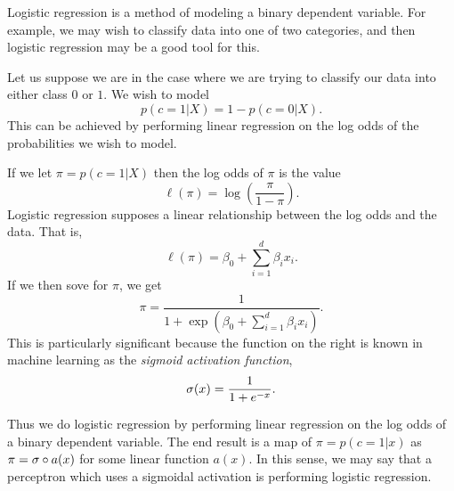 \label{logisticReg}
Logistic regression is a method of modeling a binary dependent variable.  For 
example, we may wish to classify data into one of two categories, and then 
logistic regression may be a good tool for this.

Let us suppose we are in the case where we are trying to classify our data into either class \(0\) or \(1\).  We wish to model  \[p(c=1|X) = 1-p(c=0|X).\] This can be achieved by performing linear regression on the log odds of the probabilities we wish to model.

If we let \(\pi=p(c=1|X)\) then the log odds of \(\pi\) is the value
\[\ell(\pi) = \log\left(\frac{\pi}{1-\pi}\right).\]
Logistic regression supposes a linear relationship between the log odds and 
the data.  That is,
\[\ell(\pi) = \beta_0+\sum_{i=1}^{d} \beta_ix_i.\]
If we then sove for \(\pi\), we get 
\[\pi = \frac{1}{1+\exp(\beta_0+\sum_{i=1}^{d} \beta_ix_i)}.\]
This is particularly significant because the function on the right is known in 
machine learning as the \textit{sigmoid activation function}, 
\[\sigma(x) =\frac{1}{1+e^{-x}}.\]

Thus we do logistic regression by performing linear regression on the log odds 
of a binary dependent variable.  The end result is a map of \(\pi = p(c=1|x)\) 
as \(\pi = \sigma\circ a(x)\) for some linear function \(a(x)\). In this sense, we
may say that a perceptron which uses a sigmoidal activation is performing 
logistic regression.